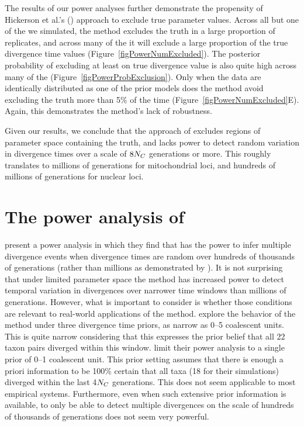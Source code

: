 \documentclass[letterpaper,12pt]{article}
\begin{document}
\begin{linenumbers}
The results of our power analyses further demonstrate the propensity of
Hickerson et al.'s (\citeyear{Hickerson2013}) approach to exclude true
parameter values.
Across all but one of the  we simulated, the method excludes the
truth in a large proportion of replicates, and across many of the  it
will exclude a large proportion of the true divergence time values
(Figure~\ref{figPowerNumExcluded}).
The posterior probability of excluding at least on true divergence value is
also quite high across many of the 
(Figure~\ref{figPowerProbExclusion}).
Only when the data are identically distributed as one of the prior models does
the method avoid excluding the truth more than 5\% of the time
(Figure~\ref{figPowerNumExcluded}E).
Again, this demonstrates the method's lack of robustness.

Given our results, we conclude that the approach of \citet{Hickerson2013}
excludes regions of parameter space containing the truth, and lacks power to
detect random variation in divergence times over a scale of $8N_C$
generations or more.
This roughly translates to millions of generations for mitochondrial loci, and
hundreds of millions of generations for nuclear loci.


\section*{The power analysis of \citet{Hickerson2013}}
\citet{Hickerson2013} present a power analysis in which they find that
\msb has the power to infer multiple divergence events when divergence times
are random over hundreds of thousands of generations (rather than millions as
demonstrated by \citet{Oaks2012}).
It is not surprising that under limited parameter space the method has
increased power to detect temporal variation in divergences over narrower time
windows than millions of generations.
However, what is important to consider is whether those conditions are relevant
to real-world applications of the method.
\citet{Oaks2012} explore the behavior of the method under three divergence time
priors, as narrow as 0--5 coalescent units. This is quite narrow considering
that this expresses the prior belief that all 22 taxon pairs diverged within
this window.
\citet{Hickerson2013} limit their power analysis to a single prior of 0--1
coalescent unit.
This prior setting assumes that there is enough a priori information to
be 100\% certain that all taxa (18 for their simulations) diverged within
the last 4$N_C$ generations.
This does not seem applicable to most empirical systems.
Furthermore, even when such extensive prior information is available, to only
be able to detect multiple divergences on the scale of hundreds of thousands of
generations does not seem very powerful.


\end{linenumbers}
\end{document}
